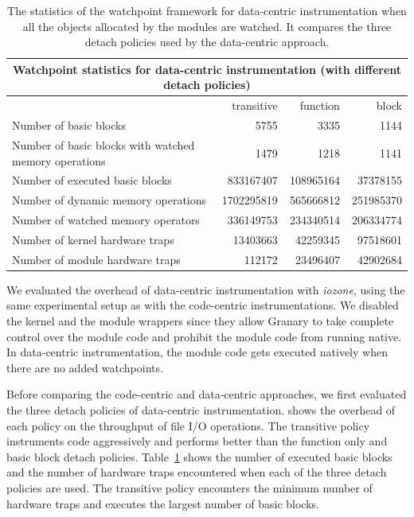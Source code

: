 \begin{table}
\begin{center}
\vspace{1em}
\begin{tabular}{|l|r|r|r|}
  \hline
  \multicolumn{4}{|c|}{Watchpoint statistics for data-centric instrumentation (with different detach policies)}  \\ \hline
  \hline
  & transitive & function & block \\
  \hline
  Number of basic blocks & 5755 & 3335 & 1144 \\
  \hline
  Number of basic blocks with watched memory operations & 1479 & 1218 & 1141\\
  \hline
  Number of executed basic blocks &  833167407  & 108965164 & 37378155\\
  \hline
  Number of dynamic memory operations & 1702295819 & 565666812 & 251985370\\
  \hline
  Number of watched memory operators & 336149753 & 234340514 & 206334774\\
  \hline
  Number of kernel hardware traps & 13403663 & 42259345 & 97518601\\
  \hline
  Number of module hardware traps & 112172 & 23496407 & 42902684\\
  \hline
\end{tabular}
\caption[Watchpoint statistics for data centric instrumentation.]{\label{table:data-centric-table} The statistics of the watchpoint framework for data-centric instrumentation when all the objects allocated by the modules are watched. It compares the three detach policies used by the data-centric approach.}
\end{center}
\end{table}

We evaluated the overhead of data-centric instrumentation with \emph{iozone}, using the same experimental setup as with the code-centric instrumentations. We disabled the kernel and the module wrappers since they allow Granary to take complete control over the module code and prohibit the module code from running native. In data-centric instrumentation, the module code gets executed natively when there are no added watchpoints. 

Before comparing the code-centric and data-centric approaches, we first evaluated the three detach policies of data-centric instrumentation.  shows the overhead of each policy on the throughput of file I/O operations. The transitive policy instruments code aggressively and performs better than the function only and basic block detach policies. Table~\ref{table:data-centric-table} shows the number of executed basic blocks and the number of hardware traps encountered when each of the three detach policies are used. The transitive policy encounters the minimum number of hardware traps and executes the largest number of basic blocks. %

